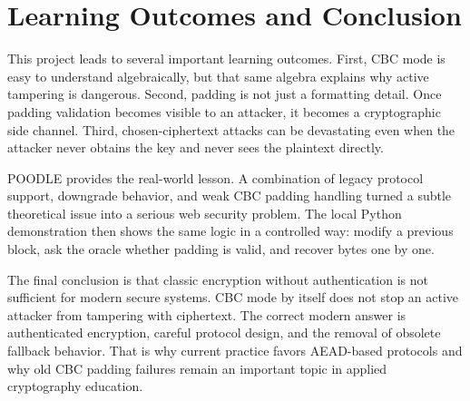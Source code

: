 \section{Learning Outcomes and Conclusion}

This project leads to several important learning outcomes. First, CBC mode is easy to understand algebraically, but that same algebra explains why active tampering is dangerous. Second, padding is not just a formatting detail. Once padding validation becomes visible to an attacker, it becomes a cryptographic side channel. Third, chosen-ciphertext attacks can be devastating even when the attacker never obtains the key and never sees the plaintext directly.

POODLE provides the real-world lesson. A combination of legacy protocol support, downgrade behavior, and weak CBC padding handling turned a subtle theoretical issue into a serious web security problem. The local Python demonstration then shows the same logic in a controlled way: modify a previous block, ask the oracle whether padding is valid, and recover bytes one by one.

The final conclusion is that classic encryption without authentication is not sufficient for modern secure systems. CBC mode by itself does not stop an active attacker from tampering with ciphertext. The correct modern answer is authenticated encryption, careful protocol design, and the removal of obsolete fallback behavior. That is why current practice favors AEAD-based protocols and why old CBC padding failures remain an important topic in applied cryptography education.

